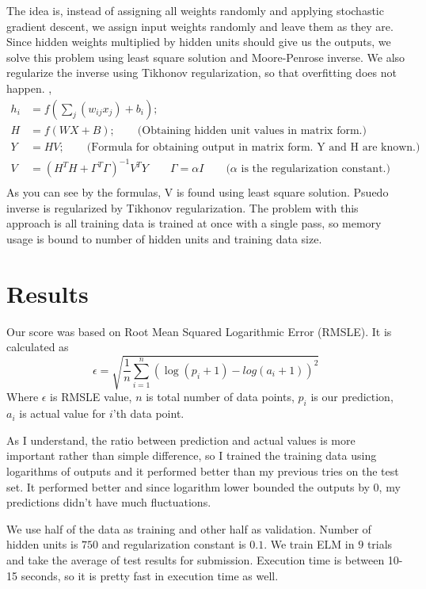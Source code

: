 \documentclass[11pt]{article} %
\begin{document}
The idea is, instead of assigning all weights randomly and applying stochastic gradient descent, we assign input weights randomly and leave them as they are. Since hidden weights multiplied by hidden units should give us the outputs, we solve this problem using least square solution and Moore-Penrose inverse. We also regularize the inverse using Tikhonov regularization, so that overfitting does not happen. \cite{huang2004extreme},\cite{huang2012extreme}
\[ 
\begin{aligned}
h_{i} &= f(\sum_{j}(w_{ij}x_{j}) + b_{i}); \\
H &= f(WX + B); \qquad \text{(Obtaining hidden unit values in matrix form.)} \\
Y &= HV; \qquad \text{(Formula for obtaining output in matrix form. Y and H are known.)} \\
V &= (H^{T}H+ \Gamma^{T} \Gamma )^{-1}V^{T}Y \qquad \Gamma = \alpha I \qquad \text{($\alpha$ is the regularization constant.)}\\
\end{aligned}
\]
As you can see by the formulas, V is found using least square solution. Psuedo inverse is regularized by Tikhonov regularization. The problem with this approach is all training data is trained at once with a single pass, so memory usage is bound to number of hidden units and training data size.

\section{Results}
Our score was based on Root Mean Squared Logarithmic Error (RMSLE). It is calculated as
\[
\epsilon = \sqrt{\frac{1}{n}\sum_{i=1}^{n}(\log(p_{i}+1) - log(a_{i}+1))^2}
\]
Where $\epsilon$ is RMSLE value, $n$ is total number of data points, $p_{i}$ is our prediction, $a_{i}$ is actual value for $i$'th data point.

As I understand, the ratio between prediction and actual values is more important rather than simple difference, so I trained the training data using logarithms of outputs and it performed better than my previous tries on the test set. It performed better and since logarithm lower bounded the outputs by 0, my predictions didn't have much fluctuations. 

We use half of the data as training and other half as validation. Number of hidden units is $750$ and regularization constant is $0.1$. We train ELM in $9$ trials and take the average of test results for submission. Execution time is between 10-15 seconds, so it is pretty fast in execution time as well.
\end{document}
